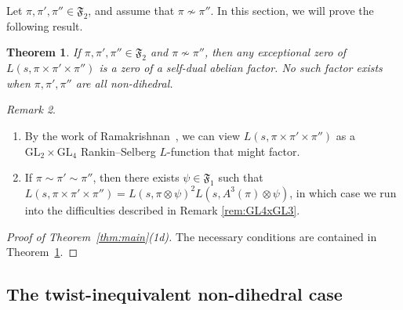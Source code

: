 \documentclass[11pt]{amsart}
\newtheorem{theorem}{Theorem}[section]
\theoremstyle{remark}
\newtheorem{remark}[theorem]{Remark}
\newcommand{\GL}{\mathrm{GL}}
\newcommand{\fF}{\mathfrak{F}}
\numberwithin{equation}{section}
\begin{document}
Let $\pi,\pi',\pi'' \in \fF_2$, and assume that $\pi\not\sim\pi''$.  In this section, we will prove the following result.

\begin{theorem}
\label{thm:GL2xGL2xGL2}
If $\pi,\pi',\pi''\in\mathfrak{F}_2$ and $\pi\not\sim\pi''$, then any exceptional zero of $L(s,\pi\times\pi'\times\pi'')$ is a zero of a self-dual abelian factor.  No such factor exists when $\pi,\pi',\pi''$ are all non-dihedral.
\end{theorem}

\begin{remark}
\begin{enumerate}[leftmargin=*]
	\item By the work of Ramakrishnan~\cite{Ramakrishnan}, we can view $L(s,\pi\times\pi'\times\pi'')$ as a $\GL_2\times\GL_4$ Rankin--Selberg $L$-function that might factor.
	\item If $\pi\sim\pi'\sim\pi''$, then there exists $\psi\in\mathfrak{F}_1$ such that $L(s,\pi\times\pi'\times\pi'')=L(s,\pi\otimes\psi)^2 L(s,A^3(\pi)\otimes\psi)$, in which case we run into the difficulties described in Remark \ref{rem:GL4xGL3}.
\end{enumerate}
\end{remark}


\begin{proof}[Proof of Theorem~\ref{thm:main}(1d)]
The necessary conditions are contained in Theorem~\ref{thm:GL2xGL2xGL2}.
\end{proof}

\subsection{The twist-inequivalent non-dihedral case}
\end{document}

